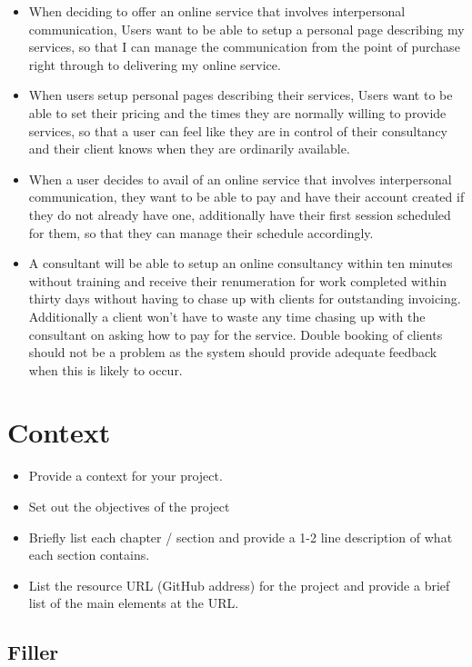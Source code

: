 \begin{itemize}
\item When deciding to offer an online service that involves interpersonal communication, Users want to be able to setup a personal page describing my services, so that I can manage the communication from the point of purchase right through to delivering my online service.
\item When users setup personal pages describing their services, Users want to be able to set their pricing and the times they are normally willing to provide services, so that a user can feel like they are in control of their consultancy and their client knows when they are ordinarily available.
\item When a user decides to avail of an online service that involves interpersonal communication, they want to be able to pay and have their account created if they do not already have one, additionally have their first session scheduled for them, so that they can manage their schedule accordingly.
\item A consultant will be able to setup an online consultancy within ten minutes without training and receive their renumeration for work completed within thirty days without having to chase up with clients for outstanding invoicing.  Additionally a client won’t have to waste any time chasing up with the consultant on asking how to pay for the service.  Double booking of clients should not be a problem as the system should provide adequate feedback when this is likely to occur. 
\end{itemize}

\chapter{Context}
\begin{itemize}
\item Provide a context for your project.
\item Set out the objectives of the project
\item Briefly list each chapter / section and provide a 1-2 line description of what each section contains.
\item List the resource URL (GitHub address) for the project and provide a brief list of the main elements at the URL.
\end{itemize}

\section{Filler}


